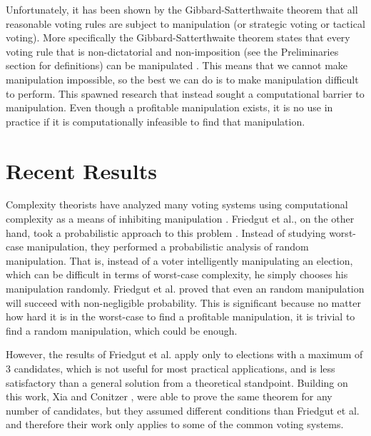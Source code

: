 	Unfortunately, it has been shown by the Gibbard-Satterthwaite theorem that all reasonable voting rules are subject to manipulation (or strategic voting or tactical voting). More specifically the Gibbard-Satterthwaite theorem states that every voting rule that is non-dictatorial and non-imposition (see the Preliminaries section for definitions) can be manipulated \cite{gibbard1973manipulation, satterthwaite1975strategy, duggan2000strategic}. This means that we cannot make manipulation impossible, so the best we can do is to make manipulation difficult to perform. This spawned research that instead sought a computational barrier to manipulation. Even though a profitable manipulation exists, it is no use in practice if it is computationally infeasible to find that manipulation.


\section{Recent Results}

	Complexity theorists have analyzed many voting systems using computational complexity as a means of inhibiting manipulation \cite{bartholdi1989computational, hemaspaandra2009hybrid}. Friedgut et al., on the other hand, took a probabilistic approach to this problem \cite{friedgut2008elections}. Instead of studying worst-case manipulation, they performed a probabilistic analysis of random manipulation. That is, instead of a voter intelligently manipulating an election, which can be difficult in terms of worst-case complexity, he simply chooses his manipulation randomly. Friedgut et al. \cite{friedgut2008elections} proved that even an random manipulation will succeed with non-negligible probability. This is significant because no matter how hard it is in the worst-case to find a profitable manipulation, it is trivial to find a random manipulation, which could be enough.

	However, the results of Friedgut et al. \cite{friedgut2008elections} apply only to elections with a maximum of 3 candidates, which is not useful for most practical applications, and is less satisfactory than a general solution from a theoretical standpoint. Building on this work, Xia and Conitzer \cite{xia2008sufficient}, were able to prove the same theorem for any number of candidates, but they assumed different conditions than Friedgut et al. and therefore their work only applies to some of the common voting systems.
